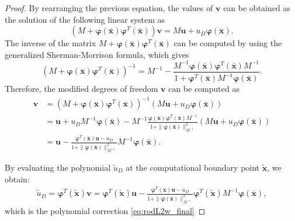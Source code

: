 \documentclass{article}
\renewcommand{\phi}{\varphi}
\begin{document}
\begin{proof}
    By rearranging the previous equation, the values of $\boldsymbol{v}$ can be obtained as the solution of the following linear system as
\begin{equation}
    (M + \boldsymbol{\phi}(\bar{\boldsymbol{x}}) \boldsymbol{\phi}^T(\bar{\boldsymbol{x}})) \boldsymbol{v} = M\boldsymbol{u} + u_D \boldsymbol{\phi}(\bar{\boldsymbol{x}}).
\end{equation}
The inverse of the matrix $M + \boldsymbol{\phi}(\bar{\boldsymbol{x}}) \boldsymbol{\phi}^T(\bar{\boldsymbol{x}})$ can be computed by using the generalized Sherman-Morrison formula, which gives
\begin{equation}
    (M + \boldsymbol{\phi}(\bar{\boldsymbol{x}}) \boldsymbol{\phi}^T(\bar{\boldsymbol{x}}))^{-1} = M^{-1} - \frac{M^{-1}\boldsymbol{\phi}(\bar{\boldsymbol{x}}) \boldsymbol{\phi}^T(\bar{\boldsymbol{x}})M^{-1}}{1 + \boldsymbol{\phi}^T(\bar{\boldsymbol{x}}) M^{-1}\boldsymbol{\phi}(\bar{\boldsymbol{x}})}.
\end{equation}
Therefore, the modified degrees of freedom $\boldsymbol{v}$ can be computed as
\begin{equation}
    \begin{split}
    \boldsymbol{v} &= (M + \boldsymbol{\phi}(\bar{\boldsymbol{x}}) \boldsymbol{\phi}^T(\bar{\boldsymbol{x}}))^{-1} (M\boldsymbol{u} + u_D \boldsymbol{\phi}(\bar{\boldsymbol{x}})) \\
    &= \boldsymbol{u} + u_D M^{-1} \boldsymbol{\phi}(\bar{\boldsymbol{x}}) - M^{-1}\frac{\boldsymbol{\phi}(\bar{\boldsymbol{x}}) \boldsymbol{\phi}^T(\bar{\boldsymbol{x}})M^{-1}}{1 + \|\boldsymbol{\phi}(\bar{\boldsymbol{x}})\|^2_{M^{-1}}} (M\boldsymbol{u} + u_D \boldsymbol{\phi}(\bar{\boldsymbol{x}})) \\
    &= \boldsymbol{u} - \frac{\boldsymbol{\phi}^T(\bar{\boldsymbol{x}})\boldsymbol{u} - u_D}{1 + \|\boldsymbol{\phi}(\bar{\boldsymbol{x}})\|^2_{M^{-1}}} M^{-1}\boldsymbol{\phi}(\bar{\boldsymbol{x}}) .
    \end{split}
\end{equation}

By evaluating the polynomial $\tilde u_D$ at the computational boundary point $\tilde{\boldsymbol{x}}$, we obtain:
\begin{equation}
    \begin{split}
    \tilde u_D = \boldsymbol{\phi}^T(\tilde{\boldsymbol{x}}) \boldsymbol{v} = \boldsymbol{\phi}^T(\tilde{\boldsymbol{x}}) \boldsymbol{u} - \frac{\boldsymbol{\phi}^T(\bar{\boldsymbol{x}})\boldsymbol{u} - u_D}{1 + \|\boldsymbol{\phi}(\bar{\boldsymbol{x}})\|^2_{M^{-1}}} \boldsymbol{\phi}^T(\tilde{\boldsymbol{x}}) M^{-1}\boldsymbol{\phi}(\bar{\boldsymbol{x}}) , 
    \end{split}
\end{equation}
which is the polynomial correction \eqref{eq:rodL2w_final}
\end{proof}
\end{document}
